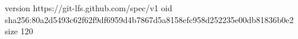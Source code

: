 version https://git-lfs.github.com/spec/v1
oid sha256:80a2d5493c62f62f9df6959d4b7867d5a8158efc958d252235e00db81836b0e2
size 120
